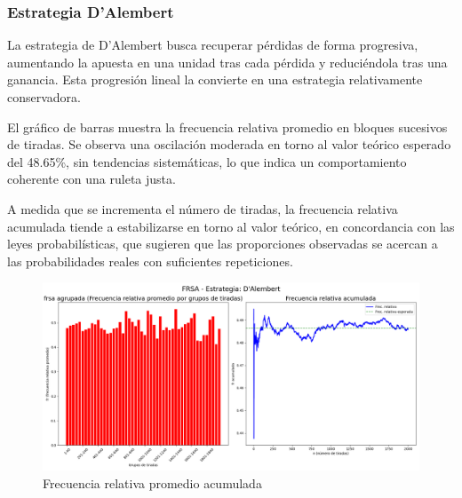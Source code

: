 \documentclass{article}
\begin{document}
\subsubsection{Estrategia D'Alembert}
La estrategia de D'Alembert busca recuperar pérdidas de forma progresiva, aumentando la apuesta en una unidad tras cada pérdida y reduciéndola tras una ganancia. Esta progresión lineal la convierte en una estrategia relativamente conservadora.

El gráfico de barras muestra la frecuencia relativa promedio en bloques sucesivos de tiradas. Se observa una oscilación moderada en torno al valor teórico esperado del 48.65\%, sin tendencias sistemáticas, lo que indica un comportamiento coherente con una ruleta justa.

A medida que se incrementa el número de tiradas, la frecuencia relativa acumulada tiende a estabilizarse en torno al valor teórico, en concordancia con las leyes probabilísticas, que sugieren que las proporciones observadas se acercan a las probabilidades reales con suficientes repeticiones.
\begin{figure}[H]
    \centering
    \includegraphics[width=1\textwidth]{Imagenes/frsa_D'Alembert.png}
    \caption{Frecuencia relativa promedio acumulada}
    \label{fig:dal_frsa}
\end{figure}
\end{document}
